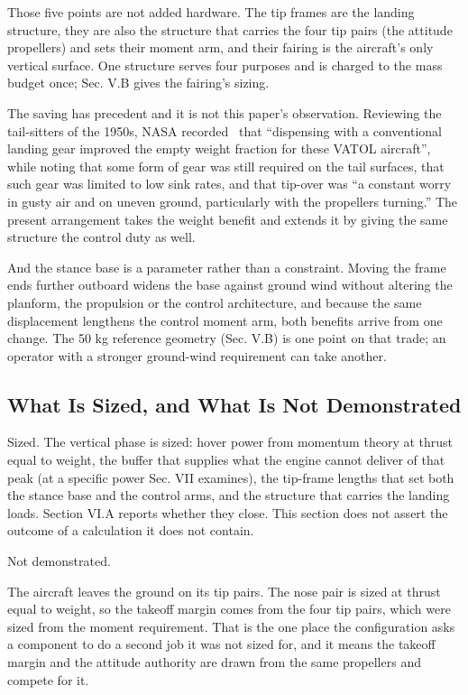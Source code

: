 \documentclass[journal]{new-aiaa}
\begin{document}
Those five points are not added hardware. The tip frames are the landing structure, they are also the structure that carries the four tip pairs (the attitude propellers) and sets their moment arm, and their fairing is the aircraft's only vertical surface. One structure serves four purposes and is charged to the mass budget once; Sec. V.B gives the fairing's sizing.

The saving has precedent and it is not this paper's observation. Reviewing the tail-sitters of the 1950s, NASA recorded~\cite{r17} that ``dispensing with a conventional landing gear improved the empty weight fraction for these VATOL aircraft'', while noting that some form of gear was still required on the tail surfaces, that such gear was limited to low sink rates, and that tip-over was ``a constant worry in gusty air and on uneven ground, particularly with the propellers turning.'' The present arrangement takes the weight benefit and extends it by giving the same structure the control duty as well.

And the stance base is a parameter rather than a constraint. Moving the frame ends further outboard widens the base against ground wind without altering the planform, the propulsion or the control architecture, and because the same displacement lengthens the control moment arm, both benefits arrive from one change. The 50 kg reference geometry (Sec. V.B) is one point on that trade; an operator with a stronger ground-wind requirement can take another.

\subsection{What Is Sized, and What Is Not Demonstrated}

Sized. The vertical phase is sized: hover power from momentum theory at thrust equal to weight, the buffer that supplies what the engine cannot deliver of that peak (at a specific power Sec. VII examines), the tip-frame lengths that set both the stance base and the control arms, and the structure that carries the landing loads. Section VI.A reports whether they close. This section does not assert the outcome of a calculation it does not contain.

Not demonstrated.

The aircraft leaves the ground on its tip pairs. The nose pair is sized at thrust equal to weight, so the takeoff margin comes from the four tip pairs, which were sized from the moment requirement. That is the one place the configuration asks a component to do a second job it was not sized for, and it means the takeoff margin and the attitude authority are drawn from the same propellers and compete for it.
\end{document}
